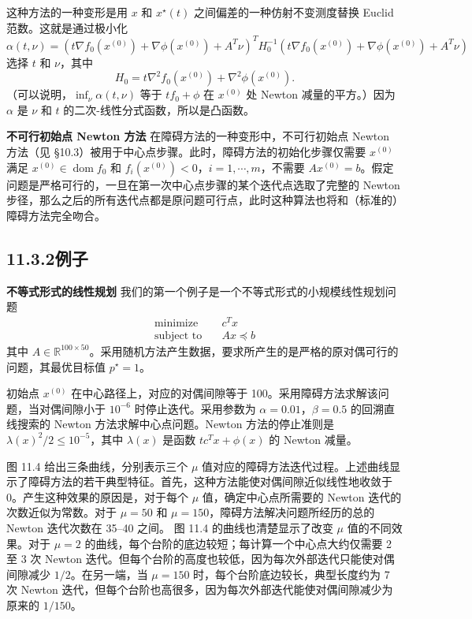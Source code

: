 \documentclass[UTF8, 12pt, fontset=fandol, oneside]{ctexart}
\begin{document}
这种方法的一种变形是用 $x$ 和 $x^\star(t)$ 之间偏差的一种仿射不变测度替换 Euclid 范数。这就是通过极小化
\[
\alpha(t,\nu)=\left(t\nabla f_0(x^{(0)})+\nabla\phi(x^{(0)})+A^T\nu\right)^TH_0^{-1}\left(t\nabla f_0(x^{(0)})+\nabla\phi(x^{(0)})+A^T\nu\right)
\]
选择 $t$ 和 $\nu$，其中
\[
H_0=t\nabla^2 f_0(x^{(0)})+\nabla^2\phi(x^{(0)}).
\]
（可以说明，$\inf_\nu\alpha(t,\nu)$ 等于 $tf_0+\phi$ 在 $x^{(0)}$ 处 Newton 减量的平方。）因为 $\alpha$ 是 $\nu$ 和 $t$ 的二次-线性分式函数，所以是凸函数。

\noindent\textbf{不可行初始点 Newton 方法}\quad
在障碍方法的一种变形中，不可行初始点 Newton 方法（见 \S10.3）被用于中心点步骤。此时，障碍方法的初始化步骤仅需要 $x^{(0)}$ 满足 $x^{(0)}\in\operatorname{dom} f_0$ 和 $f_i(x^{(0)})<0$，$i=1,\cdots,m$，不需要 $Ax^{(0)}=b$。假定问题是严格可行的，一旦在第一次中心点步骤的某个迭代点选取了完整的 Newton 步径，那么之后的所有迭代点都是原问题可行点，此时这种算法也将和（标准的）障碍方法完全吻合。

\subsection*{11.3.2\quad 例子}

\noindent\textbf{不等式形式的线性规划}\quad
我们的第一个例子是一个不等式形式的小规模线性规划问题
\[
\begin{aligned}
\text{minimize}\quad & c^Tx\\
\text{subject to}\quad & Ax\preceq b
\end{aligned}
\]
其中 $A\in\mathbb{R}^{100\times 50}$。采用随机方法产生数据，要求所产生的是严格的原对偶可行的问题，其最优目标值 $p^\star=1$。

初始点 $x^{(0)}$ 在中心路径上，对应的对偶间隙等于 100。采用障碍方法求解该问题，当对偶间隙小于 $10^{-6}$ 时停止迭代。采用参数为 $\alpha=0.01$，$\beta=0.5$ 的回溯直线搜索的 Newton 方法求解中心点问题。Newton 方法的停止准则是 $\lambda(x)^2/2\leq 10^{-5}$，其中 $\lambda(x)$ 是函数 $tc^Tx+\phi(x)$ 的 Newton 减量。

图 11.4 给出三条曲线，分别表示三个 $\mu$ 值对应的障碍方法迭代过程。上述曲线显示了障碍方法的若干典型特征。首先，这种方法能使对偶间隙近似线性地收敛于 0。产生这种效果的原因是，对于每个 $\mu$ 值，确定中心点所需要的 Newton 迭代的次数近似为常数。对于 $\mu=50$ 和 $\mu=150$，障碍方法解决问题所经历的总的 Newton 迭代次数在 35--40 之间。
图 11.4 的曲线也清楚显示了改变 $\mu$ 值的不同效果。对于 $\mu=2$ 的曲线，每个台阶的底边较短；每计算一个中心点大约仅需要 2 至 3 次 Newton 迭代。但每个台阶的高度也较低，因为每次外部迭代只能使对偶间隙减少 $1/2$。在另一端，当 $\mu=150$ 时，每个台阶底边较长，典型长度约为 7 次 Newton 迭代，但每个台阶也高很多，因为每次外部迭代能使对偶间隙减少为原来的 $1/150$。
\end{document}
